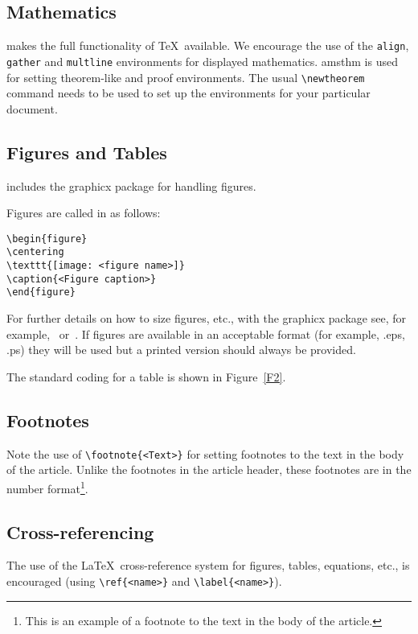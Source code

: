\documentclass[fonts]{icst}
\begin{document}
\subsection{Mathematics} \textsf{\journalclass} makes the full
functionality of \AmS\/\TeX\ available. We encourage the use of
the \verb"align", \verb"gather" and \verb"multline" environments
for displayed mathematics. \textsf{amsthm} is used for setting
theorem-like and proof environments. The usual \verb"\newtheorem"
command needs to be used to set up the environments for your
particular document.

\subsection{Figures and Tables} \textsf{\journalclass} includes the
\textsf{graphicx} package for handling figures.

Figures are called in as follows:
\begin{verbatim}
\begin{figure}
\centering
\texttt{[image: <figure name>]}
\caption{<Figure caption>}
\end{figure}
\end{verbatim}

For further details on how to size figures, etc., with the
\textsf{graphicx} package see, for example,~\cite{R1}
or~\cite{R3}. If figures are available in an
acceptable format (for example, .eps, .ps) they will be used but a
printed version should always be provided. \medbreak

The standard coding for a table is shown in Figure~\ref{F2}.

\subsection{Footnotes}
Note the use of \verb"\footnote{<Text>}" for setting footnotes to the text in the body of the article. Unlike the footnotes in the article header, these footnotes are in the number format\footnote{This is an example of a footnote to the text in the body of the article.}. 

\subsection{Cross-referencing}
The use of the \LaTeX\ cross-reference system
for figures, tables, equations, etc., is encouraged
(using \verb"\ref{<name>}" and \verb"\label{<name>}").
\end{document}
